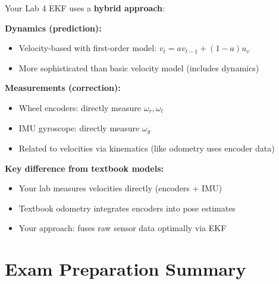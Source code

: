 \begin{tcolorbox}[colback=yellow!5!white,colframe=orange!75!black,title=Your Lab 4 Implementation]

Your Lab 4 EKF uses a \textbf{hybrid approach}:

\vspace{2mm}
\textbf{Dynamics (prediction):}
\begin{itemize}
    \item Velocity-based with first-order model: $v_t = av_{t-1} + (1-a)u_v$
    \item More sophisticated than basic velocity model (includes dynamics)
\end{itemize}

\textbf{Measurements (correction):}
\begin{itemize}
    \item Wheel encoders: directly measure $\omega_r, \omega_l$
    \item IMU gyroscope: directly measure $\omega_g$
    \item Related to velocities via kinematics (like odometry uses encoder data)
\end{itemize}

\textbf{Key difference from textbook models:}
\begin{itemize}
    \item Your lab measures velocities directly (encoders + IMU)
    \item Textbook odometry integrates encoders into pose estimates
    \item Your approach: fuses raw sensor data optimally via EKF
\end{itemize}

\end{tcolorbox}

\section{Exam Preparation Summary}

